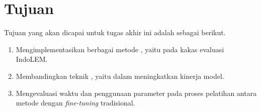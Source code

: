 \section{Tujuan}

Tujuan yang akan dicapai untuk tugas akhir ini adalah sebagai berikut.

\begin{enumerate}
    \item Mengimplementasikan berbagai metode \PEFT, yaitu \methodPEFT pada kakas evaluasi IndoLEM.
    \item Membandingkan teknik \PEFT, yaitu \methodPEFT dalam meningkatkan kinerja model.
    \item Mengevaluasi waktu dan penggunaan parameter pada proses pelatihan antara metode \PEFT dengan \textit{fine-tuning} tradisional.
\end{enumerate}
